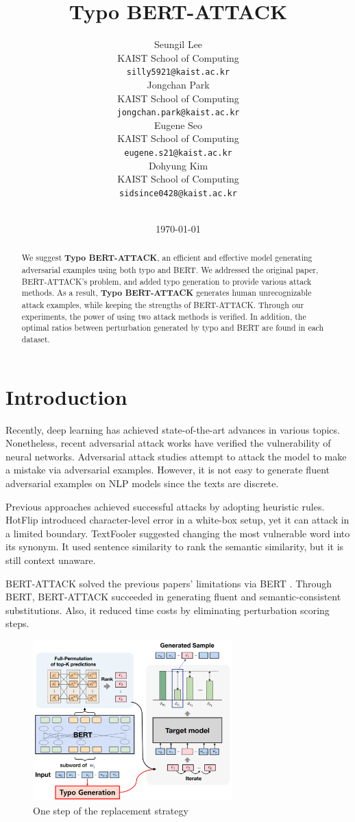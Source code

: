 \documentclass[11pt,a4paper]{article}
\title{Typo BERT-ATTACK}
\author{Seungil Lee \\
  KAIST School of Computing\\
  \texttt{silly5921@kaist.ac.kr} \\\And
  Jongchan Park \\
  KAIST School of Computing\\
  \texttt{jongchan.park@kaist.ac.kr} \\\AND
  Eugene Seo \\
  KAIST School of Computing\\
  \texttt{eugene.s21@kaist.ac.kr} \\\And
  Dohyung Kim \\
  KAIST School of Computing\\
  \texttt{sidsince0428@kaist.ac.kr} \\\
  }
\date{\today}
\begin{document}
\maketitle
\begin{abstract}
We suggest \textbf{Typo BERT-ATTACK}, an efficient and effective model generating adversarial examples using both typo and BERT. We addressed the original paper, BERT-ATTACK’s problem, and added typo generation to provide various attack methods. As a result, \textbf{Typo BERT-ATTACK} generates human unrecognizable attack examples, while keeping the strengths of BERT-ATTACK. Through our experiments, the power of using two attack methods is verified. In addition, the optimal ratios between perturbation generated by typo and BERT are found in each dataset. 
\end{abstract}

\section{Introduction}

Recently, deep learning has achieved state-of-the-art advances in various topics. Nonetheless, recent adversarial attack works have verified the vulnerability of neural networks. Adversarial attack studies attempt to attack the model to make a mistake via adversarial examples. However, it is not easy to generate fluent adversarial examples on NLP models since the texts are discrete. 

Previous approaches achieved successful attacks by adopting heuristic rules. HotFlip \citep{HotFlip} introduced character-level error in a white-box setup, yet it can attack in a limited boundary. TextFooler \citep{TextFooler} suggested changing the most vulnerable word into its synonym. It used sentence similarity to rank the semantic similarity, but it is still context unaware.

BERT-ATTACK \citep{BERT-ATTACK:20} solved the previous papers’ limitations via BERT \citep{BERT}. Through BERT, BERT-ATTACK succeeded in generating fluent and semantic-consistent substitutions. Also, it reduced time costs by eliminating perturbation scoring steps. 

\begin{figure}[htbp]
\centering
    \includegraphics[width=218.268pt]{figure1.png}
    \caption{One step of the replacement strategy} 
    \label{fig:Typo_BERT-ATTACK}
\end{figure}
\end{document}
